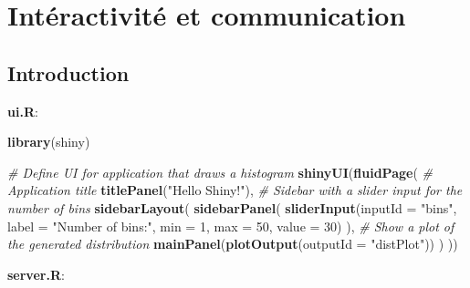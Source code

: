 \documentclass[]{article}
\newenvironment{Shaded}{\begin{snugshade}}{\end{snugshade}}
\newcommand{\KeywordTok}[1]{\textcolor[rgb]{0.13,0.29,0.53}{\textbf{#1}}}
\newcommand{\DataTypeTok}[1]{\textcolor[rgb]{0.13,0.29,0.53}{#1}}
\newcommand{\DecValTok}[1]{\textcolor[rgb]{0.00,0.00,0.81}{#1}}
\newcommand{\StringTok}[1]{\textcolor[rgb]{0.31,0.60,0.02}{#1}}
\newcommand{\CommentTok}[1]{\textcolor[rgb]{0.56,0.35,0.01}{\textit{#1}}}
\newcommand{\NormalTok}[1]{#1}
\begin{document}
\section{Intéractivité et
communication}\label{interactivite-et-communication}

\subsection{Introduction}\label{introduction}

\textbf{ui.R}:

\begin{Shaded}
\begin{Highlighting}[]
\KeywordTok{library}\NormalTok{(shiny)}

\CommentTok{# Define UI for application that draws a histogram}
\KeywordTok{shinyUI}\NormalTok{(}\KeywordTok{fluidPage}\NormalTok{(}
  \CommentTok{# Application title}
  \KeywordTok{titlePanel}\NormalTok{(}\StringTok{"Hello Shiny!"}\NormalTok{),}
  \CommentTok{# Sidebar with a slider input for the number of bins}
  \KeywordTok{sidebarLayout}\NormalTok{(}
    \KeywordTok{sidebarPanel}\NormalTok{(}
      \KeywordTok{sliderInput}\NormalTok{(}\DataTypeTok{inputId =} \StringTok{"bins"}\NormalTok{, }
                  \DataTypeTok{label =} \StringTok{"Number of bins:"}\NormalTok{,}
                  \DataTypeTok{min =} \DecValTok{1}\NormalTok{, }\DataTypeTok{max =} \DecValTok{50}\NormalTok{, }\DataTypeTok{value =} \DecValTok{30}\NormalTok{)}
\NormalTok{    ),}
    \CommentTok{# Show a plot of the generated distribution}
    \KeywordTok{mainPanel}\NormalTok{(}\KeywordTok{plotOutput}\NormalTok{(}\DataTypeTok{outputId =} \StringTok{"distPlot"}\NormalTok{))}
\NormalTok{  )}
\NormalTok{))}
\end{Highlighting}
\end{Shaded}

\textbf{server.R}:
\end{document}
